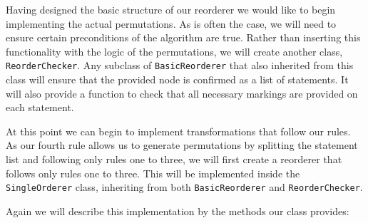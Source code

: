 \documentclass[twoside,a4paper]{report}
\begin{document}
Having designed the basic structure of our reorderer we would like to begin implementing the actual permutations. As is often the case, we will need to
ensure certain preconditions of the algorithm are true. Rather than inserting this functionality with the logic of the permutations, we will create
another class, \texttt{ReorderChecker}. Any subclass of \texttt{BasicReorderer} that also inherited from this class will ensure that the provided node
is confirmed as a list of statements. It will also provide a function to check that all necessary markings are provided on each statement.

At this point we can begin to implement transformations that follow our rules. As our fourth rule allows us to generate permutations by splitting the
statement list and following only rules one to three, we will first create a reorderer that follows only rules one to three. This will be implemented
inside the \texttt{SingleOrderer} class, inheriting from both \texttt{BasicReorderer} and \texttt{ReorderChecker}.

Again we will describe this implementation by the methods our class provides:
\end{document}
